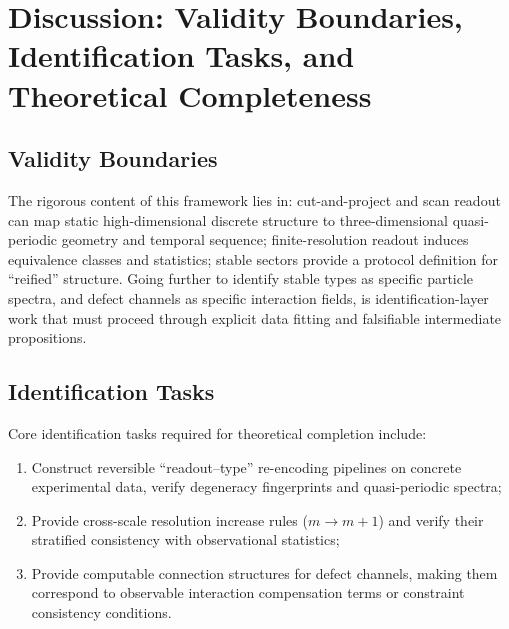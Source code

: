 \section{Discussion: Validity Boundaries, Identification Tasks, and Theoretical Completeness}

\subsection{Validity Boundaries}

The rigorous content of this framework lies in: cut-and-project and scan readout can map static high-dimensional discrete structure to three-dimensional quasi-periodic geometry and temporal sequence; finite-resolution readout induces equivalence classes and statistics; stable sectors provide a protocol definition for ``reified'' structure. Going further to identify stable types as specific particle spectra, and defect channels as specific interaction fields, is identification-layer work that must proceed through explicit data fitting and falsifiable intermediate propositions.

\subsection{Identification Tasks}

Core identification tasks required for theoretical completion include:
\begin{enumerate}
  \item Construct reversible ``readout--type'' re-encoding pipelines on concrete experimental data, verify degeneracy fingerprints and quasi-periodic spectra;
  \item Provide cross-scale resolution increase rules ($m\to m+1$) and verify their stratified consistency with observational statistics;
  \item Provide computable connection structures for defect channels, making them correspond to observable interaction compensation terms or constraint consistency conditions.
\end{enumerate}
